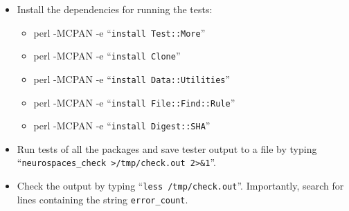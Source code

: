 \documentclass[12pt]{article}
\begin{document}
\begin{itemize}
   \item[] Install the dependencies for running the tests:
      \begin{itemize}
         \item perl -MCPAN -e ``{\tt install Test::More}''
         \item perl -MCPAN -e ``{\tt install Clone}''
         \item perl -MCPAN -e ``{\tt install Data::Utilities}''
         \item perl -MCPAN -e ``{\tt install File::Find::Rule}''
         \item perl -MCPAN -e ``{\tt install Digest::SHA}''
      \end{itemize}
      
   \item[] Run tests of all the packages and save tester output to a file  by typing ``{\tt neurospaces\_check >/tmp/check.out 2>\&1}''.
   \item[] Check the output by typing ``{\tt less /tmp/check.out}''. Importantly, search for lines containing the string {\tt error\_count}.
\end{itemize}
    
\end{document}
